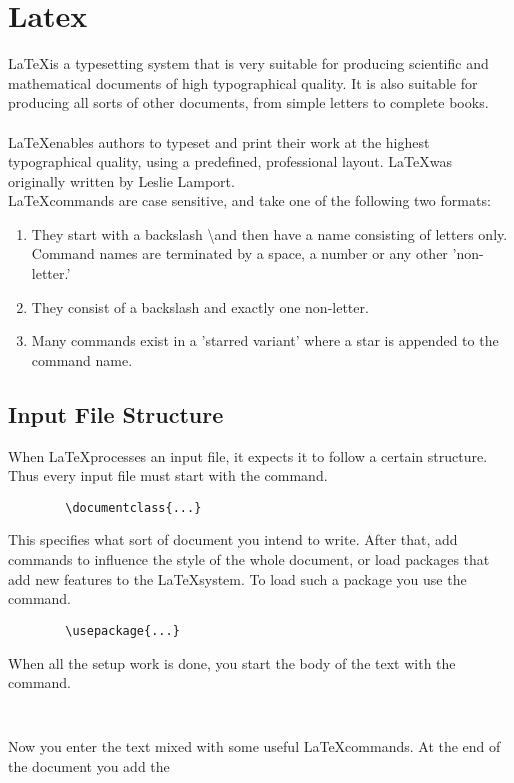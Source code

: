 	\section{Latex}
	\LaTeX is a typesetting system that is very suitable for producing scientific and mathematical documents of high typographical quality. It is also suitable for producing all sorts of other documents, from simple letters to complete books.\\
	\\
	\LaTeX enables authors to typeset and print their work at the highest typographical quality, using a predefined, professional layout. \LaTeX was originally written by Leslie Lamport.\\
	
	\LaTeX commands are case sensitive, and take one of the following two formats:
	\begin{enumerate}
		\item They start with a backslash \textbackslash and then have a name consisting of
		letters only. Command names are terminated by a space, a number or
		any other 'non-letter.'
		\item They consist of a backslash and exactly one non-letter.
		\item Many commands exist in a 'starred variant' where a star is appended
		to the command name.
	\end{enumerate}
	\subsection{Input File Structure}
	When \LaTeX processes an input file, it expects it to follow a certain structure. Thus every input file must start with the command.
	\begin{verbatim}
		\documentclass{...}
	\end{verbatim}

This specifies what sort of document you intend to write. After that, add commands to influence the style of the whole document, or load packages that add new features to the \LaTeX system. To load such a package you use the command.	\\
	\begin{verbatim}
		\usepackage{...}
	\end{verbatim}
When all the setup work is done, you start the body of the text with the command.
	\begin{verbatim}
		
	\end{verbatim}
	Now you enter the text mixed with some useful \LaTeX commands. At the end of the document you add the
	\begin{verbatim}
	
	\end{verbatim}
